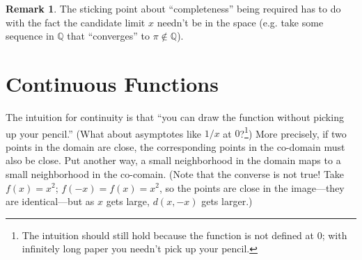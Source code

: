 \documentclass{article}
\theoremstyle{definition}
\newtheorem{remark}{Remark}
\begin{document}
\begin{remark}
  The sticking point about ``completeness'' being required has to do with the fact the candidate limit $x$ needn't be in the space (e.g. take some sequence in $\mathbb{Q}$ that ``converges'' to $\pi \notin \mathbb{Q}$).
\end{remark}

\section{Continuous Functions}
\label{sub:continuous_functions}

The intuition for continuity is that ``you can draw the function without picking up your pencil.'' (What about asymptotes like $1/x$ at $0$?\footnote{The intuition should still hold because the function is not defined at $0$; with infinitely long paper you needn't pick up your pencil.}) More precisely, if two points in the domain are close, the corresponding points in the co-domain must also be close. Put another way, a small neighborhood in the domain maps to a small neighborhood in the co-comain. (Note that the converse is not true! Take $f(x) = x^2$; $f(-x) = f(x) = x^2$, so the points are close in the image---they are identical---but as $x$ gets large, $d(x, -x)$ gets larger.)
\end{document}
